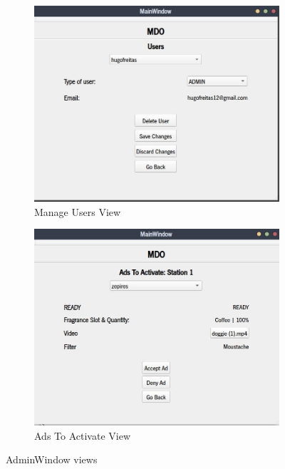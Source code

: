 \begin{figure}[htb!]
%
  \begin{subfigure}{.4\textwidth}
    \includegraphics[width=\textwidth]{img/admin-manage-users-view.jpg}%
  \caption{Manage Users View}%
  \label{fig:admin-manage-users-view}
  \end{subfigure}
  \begin{subfigure}{.4\textwidth}
    \includegraphics[width=\textwidth]{img/admin-ads-to-act.jpg}%
  \caption{Ads To Activate View}%
  \label{fig:admin-ads-to-act-view}
  \end{subfigure}
  \caption{AdminWindow views}%
  \label{fig:ptp-test}
\end{figure} 